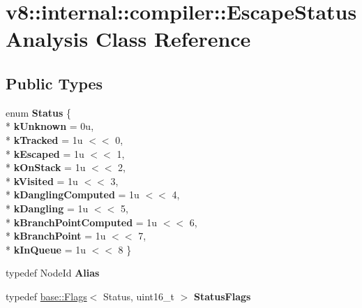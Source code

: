 \hypertarget{classv8_1_1internal_1_1compiler_1_1_escape_status_analysis}{}\section{v8\+:\+:internal\+:\+:compiler\+:\+:Escape\+Status\+Analysis Class Reference}
\label{classv8_1_1internal_1_1compiler_1_1_escape_status_analysis}
\subsection*{Public Types}
\begin{DoxyCompactItemize}
\item 
enum {\bfseries Status} \{ \\*
{\bfseries k\+Unknown} = 0u, 
\\*
{\bfseries k\+Tracked} = 1u $<$$<$ 0, 
\\*
{\bfseries k\+Escaped} = 1u $<$$<$ 1, 
\\*
{\bfseries k\+On\+Stack} = 1u $<$$<$ 2, 
\\*
{\bfseries k\+Visited} = 1u $<$$<$ 3, 
\\*
{\bfseries k\+Dangling\+Computed} = 1u $<$$<$ 4, 
\\*
{\bfseries k\+Dangling} = 1u $<$$<$ 5, 
\\*
{\bfseries k\+Branch\+Point\+Computed} = 1u $<$$<$ 6, 
\\*
{\bfseries k\+Branch\+Point} = 1u $<$$<$ 7, 
\\*
{\bfseries k\+In\+Queue} = 1u $<$$<$ 8
 \}\hypertarget{classv8_1_1internal_1_1compiler_1_1_escape_status_analysis_a502189c82f71a661bfda9ab9b470946c}{}\label{classv8_1_1internal_1_1compiler_1_1_escape_status_analysis_a502189c82f71a661bfda9ab9b470946c}

\item 
typedef Node\+Id {\bfseries Alias}\hypertarget{classv8_1_1internal_1_1compiler_1_1_escape_status_analysis_ab7d785e72916324b8df83dffdd426acb}{}\label{classv8_1_1internal_1_1compiler_1_1_escape_status_analysis_ab7d785e72916324b8df83dffdd426acb}

\item 
typedef \hyperlink{classv8_1_1base_1_1_flags}{base\+::\+Flags}$<$ Status, uint16\+\_\+t $>$ {\bfseries Status\+Flags}\hypertarget{classv8_1_1internal_1_1compiler_1_1_escape_status_analysis_a2fa653184c5b168303d8f04f0b370547}{}\label{classv8_1_1internal_1_1compiler_1_1_escape_status_analysis_a2fa653184c5b168303d8f04f0b370547}

\end{DoxyCompactItemize}
